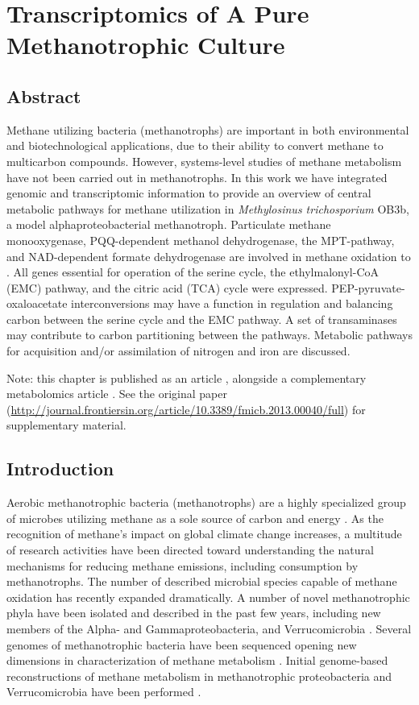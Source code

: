 \chapter{Transcriptomics of A Pure Methanotrophic Culture}
\label{chapter:A}


\section{Abstract}
Methane utilizing bacteria (methanotrophs) are important in both environmental and biotechnological applications, due to their ability to convert methane to multicarbon compounds.
However, systems-level studies of methane metabolism have not been carried out in methanotrophs.
In this work we have integrated genomic and transcriptomic information to provide an overview of central metabolic pathways for methane utilization in \textit{Methylosinus trichosporium} OB3b, a model alphaproteobacterial methanotroph.
Particulate methane monooxygenase, PQQ-dependent methanol dehydrogenase, the MPT-pathway, and NAD-dependent formate dehydrogenase are involved in methane oxidation to .
All genes essential for operation of the serine cycle, the ethylmalonyl-CoA (EMC) pathway, and the citric acid (TCA) cycle were expressed.
PEP-pyruvate-oxaloacetate interconversions may have a function in regulation and balancing carbon between the serine cycle and the EMC pathway.
A set of transaminases may contribute to carbon partitioning between the pathways.
Metabolic pathways for acquisition and/or assimilation of nitrogen and iron are discussed.

Note: this chapter is published as an article \cite{matsenOB3b}, alongside a complementary metabolomics article \cite{yangOB3b}.
See the original paper (\url{http://journal.frontiersin.org/article/10.3389/fmicb.2013.00040/full}) for supplementary material.

\section{Introduction}
Aerobic methanotrophic bacteria (methanotrophs) are a highly specialized group of microbes utilizing methane as a sole source of carbon and energy \cite{hanson1996, murrell2009}.
As the recognition of methane's impact on global climate change increases, a multitude of research activities have been directed toward understanding the natural mechanisms for reducing methane emissions, including consumption by methanotrophs.
The number of described microbial species capable of methane oxidation has recently expanded dramatically.
A number of novel methanotrophic phyla have been isolated and described in the past few years, including new members of the Alpha- and Gammaproteobacteria, and Verrucomicrobia \cite{trotsenko2008, mila2009, murrell2009}.
Several genomes of methanotrophic bacteria have been sequenced opening new dimensions in characterization of methane metabolism \cite{ward2004, dunfield2007, hou2008, chen2010, stein2010, stein2011, dam2012b}.
Initial genome-based reconstructions of methane metabolism in methanotrophic proteobacteria and Verrucomicrobia have been performed \cite{ward2004, kelly2005, hou2008, khadem2011}.

